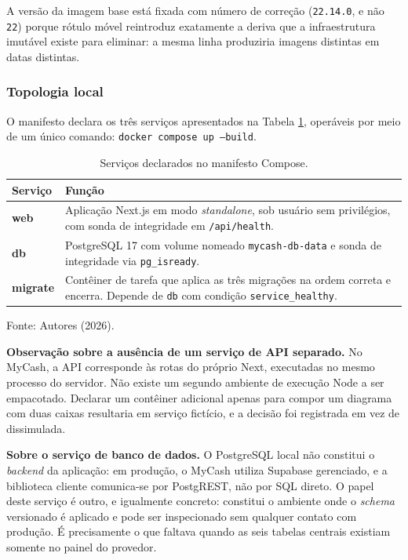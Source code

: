 \documentclass[12pt,a4paper]{article}
\begin{document}
A versão da imagem base está fixada com número de correção (\texttt{22.14.0}, e não \texttt{22}) porque rótulo móvel reintroduz exatamente a deriva que a infraestrutura imutável existe para eliminar: a mesma linha produziria imagens distintas em datas distintas.

\subsubsection{Topologia local}

O manifesto  declara os três serviços apresentados na Tabela \ref{tab:compose}, operáveis por meio de um único comando: \texttt{docker compose up --build}.

\begin{table}[H]
\centering
\caption{Serviços declarados no manifesto Compose.}
\label{tab:compose}
\renewcommand{\arraystretch}{1.4}
\begin{tabularx}{\textwidth}{@{}>{\bfseries\ttfamily\RaggedRight}p{2.2cm}>{\RaggedRight\arraybackslash}X@{}}
\toprule
\normalfont\textbf{Serviço} & \textbf{Função} \\
\midrule
web & Aplicação Next.js em modo \textit{standalone}, sob usuário sem privilégios, com sonda de integridade em \texttt{/api/health}. \\
db & PostgreSQL 17 com volume nomeado \texttt{mycash-db-data} e sonda de integridade via \texttt{pg\_isready}. \\
migrate & Contêiner de tarefa que aplica as três migrações na ordem correta e encerra. Depende de \texttt{db} com condição \texttt{service\_healthy}. \\
\bottomrule
\end{tabularx}
\vspace{0.3cm}

\noindent\footnotesize Fonte: Autores (2026).
\end{table}

\textbf{Observação sobre a ausência de um serviço de API separado.} No MyCash, a API corresponde às rotas do próprio Next, executadas no mesmo processo do servidor. Não existe um segundo ambiente de execução Node a ser empacotado. Declarar um contêiner adicional apenas para compor um diagrama com duas caixas resultaria em serviço fictício, e a decisão foi registrada em vez de dissimulada.

\textbf{Sobre o serviço de banco de dados.} O PostgreSQL local não constitui o \textit{backend} da aplicação: em produção, o MyCash utiliza Supabase gerenciado, e a biblioteca cliente comunica-se por PostgREST, não por SQL direto. O papel deste serviço é outro, e igualmente concreto: constitui o ambiente onde o \textit{schema} versionado é aplicado e pode ser inspecionado sem qualquer contato com produção. É precisamente o que faltava quando as seis tabelas centrais existiam somente no painel do provedor.
\end{document}
